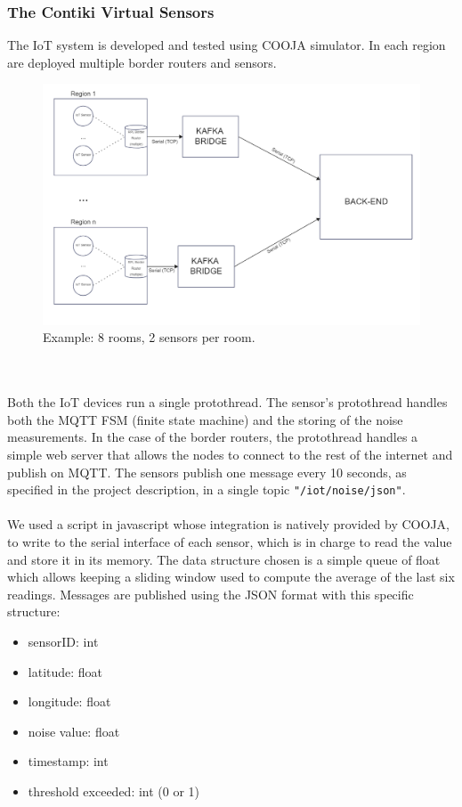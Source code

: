 \documentclass{article}
\begin{document}
\subsubsection{The Contiki Virtual Sensors}
The IoT system is developed and tested using COOJA simulator. In each region are deployed multiple border routers and sensors. 
\begin{figure}[htp]
	\centering
	\includegraphics[width=0.9\linewidth]{resources/contiki_project_1.png}
	\caption{Example: 8 rooms, 2 sensors per room.}
	\label{fig:client_server_diag}
\end{figure}
\\
\\
Both the IoT devices run a single protothread. The sensor's protothread handles both the MQTT FSM (finite state machine) and the storing of the noise measurements. In the case of the border routers, the protothread handles a simple web server that allows the nodes to connect to the rest of the internet and publish on MQTT. The sensors publish one message every 10 seconds, as specified in the project description, in a single topic \texttt{"/iot/noise/json"}.
\\
\\
We used a script in javascript whose integration is natively provided by COOJA, to write to the serial interface of each sensor, which is in charge to read the value and store it in its memory. The data structure chosen is a simple queue of float which allows keeping a sliding window used to compute the average of the last six readings. Messages are published using the JSON format with this specific structure:
\begin{itemize}
    \item sensorID: int
    \item latitude: float
    \item longitude: float
    \item noise value: float
    \item timestamp: int
    \item threshold exceeded: int (0 or 1)
\end{itemize}
\end{document}
